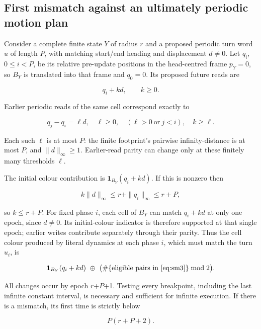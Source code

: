 \documentclass[
  11pt,
]{article}
\begin{document}
\subsection{First mismatch against an ultimately periodic motion
plan}\label{sm-3}

Consider a complete finite state \(Y\) of radius \(r\) and a proposed periodic
turn word \(u\) of length \(P\), with matching start/end heading and
displacement $d\ne0$. Let $q_i$, $0\le i<P$, be its relative
pre-update positions in the head-centred frame \(p_Y=0\), so
\(B_Y\) is translated into that frame and \(q_0=0\). Its proposed future reads are

\[
q_i+kd,\qquad k\ge0.
\]

Earlier periodic reads of the same cell correspond exactly to

\begin{equation}\label{eq:sm3}
q_j-q_i=\ell d,\quad \ell\ge0,\quad(\ell>0\ \text{or}\ j<i),\quad k\ge\ell.
\end{equation}

Each such \(\ell\) is at most \(P\): the finite footprint's pairwise
infinity-distance is at most \(P\), and
$\|d\|_\infty\ge1$. Earlier-read
parity can change only at these finitely many thresholds \(\ell\).

The initial colour contribution is $\mathbf1_{B_Y}(q_i+kd)$. If this is
nonzero then

\[
k\|d\|_\infty\le r+\|q_i\|_\infty\le r+P,
\]

so $k\le r+P$. For fixed phase $i$, each cell of $B_Y$ can match
$q_i+kd$ at only one epoch, since $d\ne0$. Its initial-colour indicator
is therefore supported at that single epoch; earlier writes contribute
separately through their parity. Thus the cell colour produced by literal dynamics at each
phase \(i\), which must match the turn \(u_i\), is

\begin{equation}\label{eq:sm4}
\mathbf1_{B_Y}(q_i+kd)\ \oplus\ \bigl(\#\{\text{eligible pairs in \eqref{eq:sm3}}\}\bmod2\bigr).
\end{equation}

All changes occur by epoch \(r\)+\(P\)+1. Testing every breakpoint, including
the last infinite constant interval, is necessary and sufficient for
infinite execution. If there is a mismatch, its first time is strictly
below

\begin{equation}\label{eq:sm5}
P(r+P+2).
\end{equation}
\end{document}
